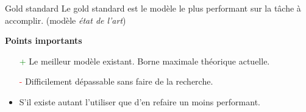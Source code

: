 \begin{frame}{Gold standard}
  Le gold standard est le modèle le plus performant sur la tâche à accomplir. (modèle \emph{état de l'art})

\textbf{Points importants}
\begin{itemize}
  \item[\textcolor{green}{+}] Le meilleur modèle existant. Borne maximale théorique actuelle.
  \item[\textcolor{red}{-}] Difficilement dépassable sans faire de la recherche.
  \item S'il existe autant l'utiliser que d'en refaire un moins performant.
\end{itemize}
\end{frame}
